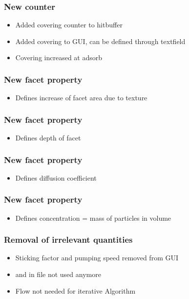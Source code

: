 \subsubsection{New counter }
\begin{itemize}[noitemsep,topsep=0pt]
\item Added covering counter to hitbuffer
\item Added covering to GUI, can be defined through textfield
\item Covering increased at adsorb
\end{itemize}

\subsubsection{New facet property }
\begin{itemize}[noitemsep,topsep=0pt]
\item Defines increase of facet area due to texture
\end{itemize}


\subsubsection{New facet property }
\begin{itemize}[noitemsep,topsep=0pt]
\item Defines depth of facet
\end{itemize}


\subsubsection{New facet property }
\begin{itemize}[noitemsep,topsep=0pt]
\item Defines diffusion coefficient
\end{itemize}


\subsubsection{New facet property }
\begin{itemize}[noitemsep,topsep=0pt]
\item Defines concentration = mass of particles in volume
\end{itemize}

\subsubsection{Removal of irrelevant quantities}
\begin{itemize}[noitemsep,topsep=0pt]
\item Sticking factor and pumping speed removed from GUI
\item {} and  in  file not used anymore
\item Flow not needed for iterative Algorithm
\end{itemize}

